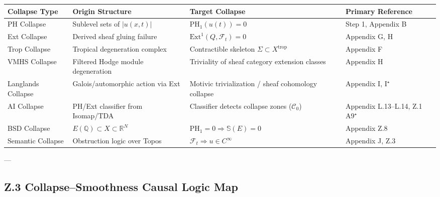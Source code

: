 \documentclass[11pt]{article}
\newcommand{\Sha}{\mathbb{S}}
\begin{document}
\begin{axiom}
\begin{axiom}
{{\begin{tabular}{>{\raggedright\arraybackslash}p{3.2cm} >{\raggedright\arraybackslash}p{4.0cm} >{\raggedright\arraybackslash}p{4.0cm} >{\raggedright\arraybackslash}p{2.5cm}}
\toprule
\textbf{Collapse Type} & \textbf{Origin Structure} & \textbf{Target Collapse} & \textbf{Primary Reference} \\
\midrule
PH Collapse & Sublevel sets of \( |u(x,t)| \) & \( \mathrm{PH}_1(u(t)) = 0 \) & Step 1, Appendix B \\
Ext Collapse & Derived sheaf gluing failure & \( \mathrm{Ext}^1(Q, \mathcal{F}_t) = 0 \) & Appendix G, H \\
Trop Collapse & Tropical degeneration complex & Contractible skeleton \( \Sigma \subset X^{\text{trop}} \) & Appendix F \\
VMHS Collapse & Filtered Hodge module degeneration & Triviality of sheaf category extension classes & Appendix H \\
Langlands Collapse & Galois/automorphic action via Ext & Motivic trivialization / sheaf cohomology collapse & Appendix I, I⁺ \\
AI Collapse & PH/Ext classifier from Isomap/TDA & Classifier detects collapse zones (\( \mathcal{C}_0 \)) & Appendix L.13–L.14, Z.1 A9⁺ \\
BSD Collapse & \( E(\mathbb{Q}) \subset X \subset \mathbb{R}^N \) & \( \mathrm{PH}_1 = 0 \Rightarrow \Sha(E) = 0 \) & Appendix Z.8 \\
Semantic Collapse & Obstruction logic over Topos & \( \mathcal{F}_t \Rightarrow u \in C^\infty \) & Appendix J, Z.3 \\
\bottomrule
\end{tabular}


---

\subsection*{Z.3 Collapse–Smoothness Causal Logic Map}

\begin{center}
\end{center}

}}
\end{axiom}
\end{axiom}
\end{document}
